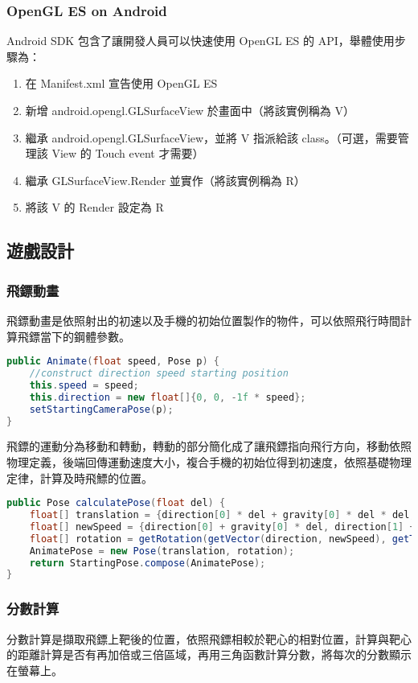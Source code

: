 \subsubsection{OpenGL ES on Android}

Android SDK 包含了讓開發人員可以快速使用 OpenGL ES 的 API，舉體使用步驟為：

\begin{enumerate}
    \item 在 Manifest.xml 宣告使用 OpenGL ES
    \item 新增 android.opengl.GLSurfaceView 於畫面中（將該實例稱為 V）
    \item 繼承 android.opengl.GLSurfaceView，並將 V 指派給該 class。（可選，需要管理該 View 的 Touch event 才需要）
    \item 繼承 GLSurfaceView.Render 並實作（將該實例稱為 R）
    \item 將該 V 的 Render 設定為 R
\end{enumerate}


\subsection{遊戲設計}

\subsubsection{飛鏢動畫}

飛鏢動畫是依照射出的初速以及手機的初始位置製作的物件，可以依照飛行時間計算飛鏢當下的鋼體參數。

\begin{lstlisting}[language=Java, caption=Animate]
public Animate(float speed, Pose p) {
    //construct direction speed starting position
    this.speed = speed;
    this.direction = new float[]{0, 0, -1f * speed};
    setStartingCameraPose(p);
}
\end{lstlisting}

飛鏢的運動分為移動和轉動，轉動的部分簡化成了讓飛鏢指向飛行方向，移動依照物理定義，後端回傳運動速度大小，複合手機的初始位得到初速度，依照基礎物理定律，計算及時飛鰾的位置。

\begin{lstlisting}[language=Java, caption=calculatePose]
public Pose calculatePose(float del) {
    float[] translation = {direction[0] * del + gravity[0] * del * del, direction[1] * del + gravity[1] * del * del, direction[2] * del + gravity[2] * del * del};
    float[] newSpeed = {direction[0] + gravity[0] * del, direction[1] + gravity[1] * del, direction[2] + gravity[2] * del};
    float[] rotation = getRotation(getVector(direction, newSpeed), getTheta(direction, newSpeed));
    AnimatePose = new Pose(translation, rotation);
    return StartingPose.compose(AnimatePose);
}
\end{lstlisting}

\subsubsection{分數計算}

分數計算是擷取飛鏢上靶後的位置，依照飛鏢相較於靶心的相對位置，計算與靶心的距離計算是否有再加倍或三倍區域，再用三角函數計算分數，將每次的分數顯示在螢幕上。

